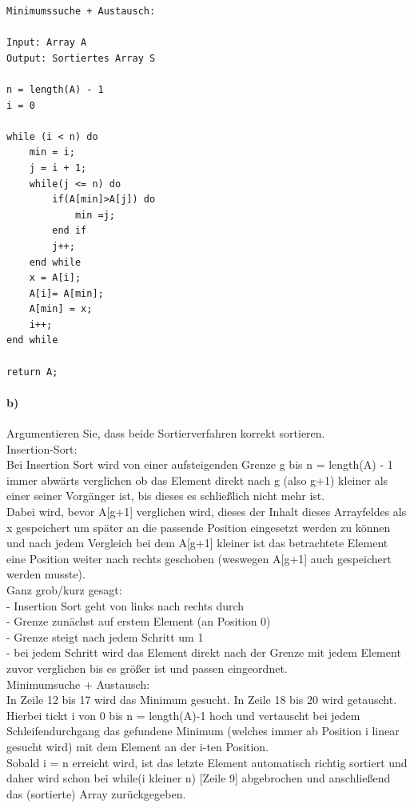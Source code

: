 \documentclass[paper=a4, fontsize=11pt]{scrartcl}
\numberwithin{equation}{section}
\numberwithin{figure}{section}
\numberwithin{table}{section}
\begin{document}
\begin{lstlisting}
Minimumssuche + Austausch:

Input: Array A
Output: Sortiertes Array S

n = length(A) - 1
i = 0

while (i < n) do
    min = i;
    j = i + 1;
    while(j <= n) do
        if(A[min]>A[j]) do
            min =j;
        end if
        j++;
    end while
    x = A[i];
    A[i]= A[min];
    A[min] = x;
    i++;
end while

return A;

\end{lstlisting}

\paragraph{b)}
Argumentieren Sie, dass beide Sortierverfahren korrekt sortieren. \\

Insertion-Sort:\\
Bei Insertion Sort wird von einer aufsteigenden Grenze g bis n = length(A) - 1 immer abwärts verglichen ob das Element direkt nach g (also g+1) kleiner als einer seiner Vorgänger ist, bis dieses es schließlich nicht mehr ist.\\
Dabei wird, bevor A[g+1] verglichen wird, dieses der Inhalt dieses Arrayfeldes als x gespeichert um später an die passende Position eingesetzt werden zu können und nach jedem Vergleich bei dem A[g+1] kleiner ist das betrachtete Element eine Position weiter nach rechts geschoben (weswegen A[g+1] auch gespeichert werden musste).\\
Ganz grob/kurz gesagt:\\
- Insertion Sort geht von links nach rechts durch\\
- Grenze zunächst auf erstem Element (an Position 0)\\
- Grenze steigt nach jedem Schritt um 1\\
- bei jedem Schritt wird das Element direkt nach der Grenze mit jedem Element zuvor verglichen bis es größer ist und passen eingeordnet.\\


Minimumsuche + Austausch:\\
In Zeile 12 bis 17 wird das Minimum gesucht. In Zeile 18 bis 20 wird getauscht.\\
Hierbei tickt i von 0 bis n = length(A)-1 hoch und vertauscht bei jedem Schleifendurchgang das gefundene Minimum (welches immer ab Position i linear gesucht wird) mit dem Element an der i-ten Position.\\
Sobald i = n erreicht wird, ist das letzte Element automatisch richtig sortiert und daher wird schon bei while(i kleiner n) [Zeile 9] abgebrochen und anschließend das (sortierte) Array zurückgegeben.\\
\end{document}
